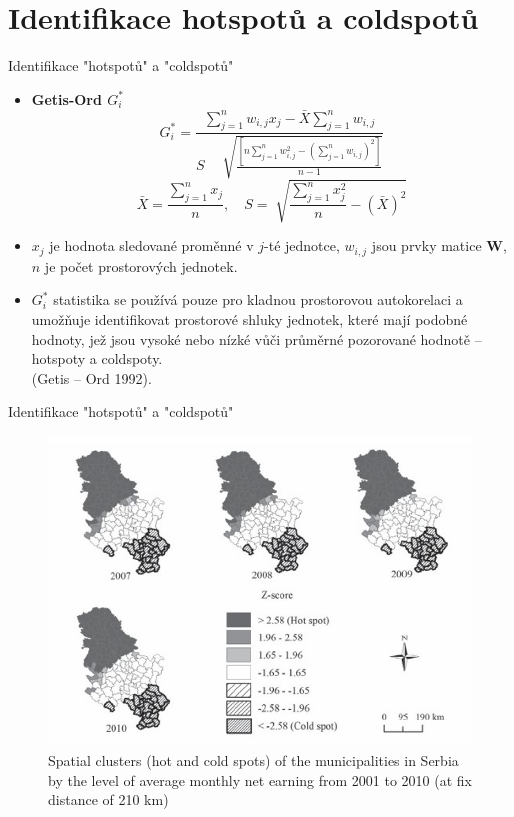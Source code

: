 \documentclass{beamer}
\begin{document}
\section{Identifikace hotspotů a coldspotů}
\begin{frame}{Identifikace "hotspotů" a "coldspotů"}
\begin{itemize}
	\item \textbf{Getis-Ord $G^\ast_i$}
	$$ G^\ast_i = \frac{\sum_{j=1}^n w_{i,j} x_j - \bar{X} \sum_{j=1}^n w_{i,j}}{S \quad\sqrt[]{\frac{[n\sum_{j=1}^n w^2_{i,j}-(\sum_{j=1}^n w_{i,j})^2]}{n-1}}}$$
	$$ \bar{X} = \frac{\sum_{j=1}^n x_j}{n}, \quad S = \sqrt[]{\frac{\sum_{j=1}^n x^2_j}{n}-(\bar{X})^2} $$
	\item $x_j$ je hodnota sledované proměnné v $j$-té jednotce, $w_{i,j}$ jsou prvky matice $\bm{W}$,  $n$ je počet prostorových jednotek.
	\item $G^\ast_i$ statistika se používá pouze pro kladnou prostorovou autokorelaci a umožňuje identifikovat prostorové shluky jednotek, které mají podobné hodnoty, jež jsou vysoké nebo nízké vůči průměrné pozorované hodnotě – hotspoty a coldspoty.\\(Getis – Ord 1992).
\end{itemize}
\end{frame}
\begin{frame}{Identifikace "hotspotů" a "coldspotů"}
\begin{figure}
	\includegraphics[width=.7\textwidth]{IMG/sp_coldspot.PNG}
	\caption{Spatial clusters (hot and cold spots) of the municipalities in Serbia by the level of average monthly net earning from 2001 to 2010 (at fix distance of 210 km)}
\end{figure}
\end{frame}
\end{document}
